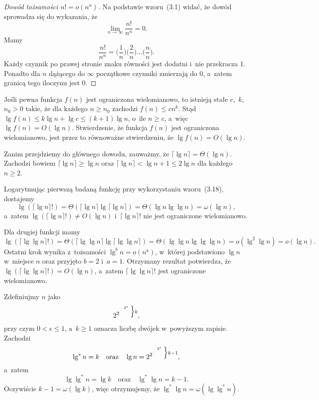 \begin{proof}[Dowód tożsamości $n!=o(n^n)$]
	Na podstawie wzoru~(3.1) widać, że dowód sprowadza się do wykazania, że
	\[
		\lim_{n\to\infty}\frac{n!}{n^n} = 0.
	\]
	Mamy
	\[
	    \frac{n!}{n^n} = \biggl(\frac{1}{n}\biggr)\biggl(\frac{2}{n}\biggr)\dots\biggl(\frac{n}{n}\biggr).
	\]
	Każdy czynnik po prawej stronie znaku równości jest dodatni i~nie przekracza 1. Ponadto dla $n$ dążącego do $\infty$ początkowe czynniki zmierzają do 0, a~zatem granicą tego iloczynu jest 0.
\end{proof}

\exercise %
Jeśli pewna funkcja $f(n)$ jest ograniczona wielomianowo, to istnieją stałe $c$,~$k$,~$n_0>0$ takie, że dla każdego $n\ge n_0$ zachodzi $f(n)\le cn^k$. Stąd $\lg f(n)\le k\lg n+\lg c\le(k+1)\lg n$, o~ile $n\ge c$, a~więc $\lg f(n)=O(\lg n)$. Stwierdzenie, że funkcja $f(n)$ jest ograniczona wielomianowo, jest przez to równoważne stwierdzeniu, że $\lg f(n)=O(\lg n)$.

Zanim przejdziemy do głównego dowodu, zauważmy, że $\lceil\lg n\rceil=\Theta(\lg n)$. Zachodzi bowiem $\lceil\lg n\rceil\ge\lg n$ oraz $\lceil\lg n\rceil<\lg n+1\le2\lg n$ dla każdego $n\ge2$.

Logarytmując pierwszą badaną funkcję przy wykorzystaniu wzoru~(3.18), dostajemy
\[
	\lg(\lceil\lg n\rceil!) = \Theta(\lceil\lg n\rceil\lg\lceil\lg n\rceil) = \Theta(\lg n\lg\lg n) = \omega(\lg n),
\]
a~zatem $\lg(\lceil\lg n\rceil!)\ne O(\lg n)$ i~$\lceil\lg n\rceil!$ nie jest ograniczone wielomianowo.

Dla drugiej funkcji mamy
\[
	\lg(\lceil\lg\lg n\rceil!) = \Theta(\lceil\lg\lg n\rceil\lg\lceil\lg\lg n\rceil) = \Theta(\lg\lg n\lg\lg\lg n) = o(\lg^2\lg n) = o(\lg n).
\]
Ostatni krok wynika z~tożsamości $\lg^bn=o(n^a)$, w~której podstawiono $\lg n$ w~miejsce $n$ oraz przyjęto $b=2$ i~$a=1$. Otrzymany rezultat potwierdza, że $\lg(\lceil\lg\lg n\rceil!)=O(\lg n)$, a~zatem $\lceil\lg\lg n\rceil!$ jest ograniczone wielomianowo.

\exercise %
Zdefiniujmy $n$ jako
\[
    2^{2^{\cdot^{\cdot^{\cdot^{2^\epsilon}}}}}\vbox{\hbox{$\Big\}\scriptstyle k$}\kern0pt},
\]
przy czym $0<\epsilon\le1$, a~$k\ge1$ oznacza liczbę dwójek w~powyższym zapisie. Zachodzi
\[
    \lg^*n=k \quad\text{oraz}\quad \lg n = 2^{2^{\cdot^{\cdot^{\cdot^{2^\epsilon}}}}}\vbox{\hbox{$\Big\}\scriptstyle k-1$}\kern0pt},
\]
a~zatem
\[
    \lg\lg^*n = \lg k \quad\text{oraz}\quad \lg^*\lg n = k-1.
\]
Oczywiście $k-1=\omega(\lg k)$, więc otrzymujemy, że $\lg^*\lg n=\omega(\lg\lg^*n)$.

